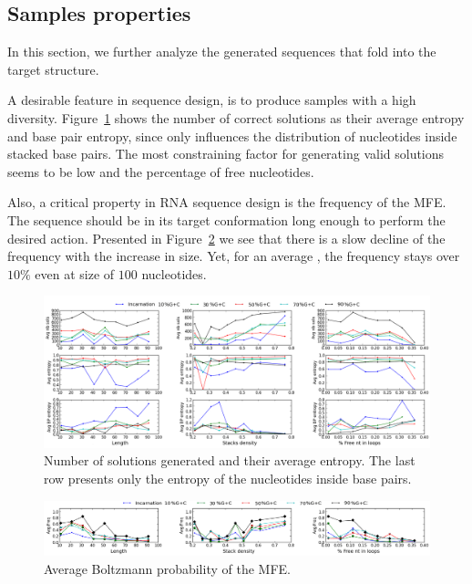\subsection{Samples properties}

In this section, we further analyze the generated sequences that fold into the 
target structure. 

A desirable feature in sequence design, is to produce samples with a high
diversity. Figure~\ref{fig:nb_sols_entropy} shows the number of correct
solutions as their average entropy and base pair entropy, since 
\ourprog  only influences the distribution of nucleotides inside 
stacked base pairs. The most constraining factor for generating valid
 solutions seems to be  low \GCContent and the percentage of free nucleotides. 


Also, a critical property in RNA sequence design is 
the frequency of the MFE. 
The sequence should be in its target conformation long enough to
perform the desired action. Presented in Figure~\ref{fig:freq} we see that
there is a slow decline of the frequency with the increase in size. Yet,
for an average \GCContent, the frequency stays over $10\%$ even
at size of $100$ nucleotides.


\begin{figure}[ht!]
	\centering
	\includegraphics[width=\textwidth]{Figures/nb_sols_entropy.png}
	\caption{Number of solutions generated and their average entropy. 
	The last row presents only the entropy of the nucleotides inside base 
	pairs.}
	\label{fig:nb_sols_entropy}
\end{figure}



\begin{figure}[ht!]
	\centering
	\includegraphics[width=\textwidth]{Figures/freq.png}
	\caption{Average Boltzmann probability of the MFE.}
	\label{fig:freq}
\end{figure}


